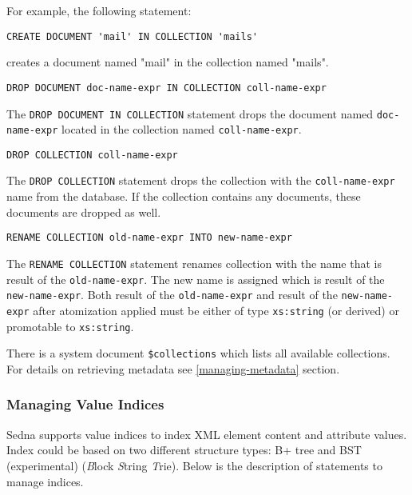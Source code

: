\documentclass[a4paper,12pt]{article}
\begin{document}
For example, the following statement:
\begin{verbatim}
CREATE DOCUMENT 'mail' IN COLLECTION 'mails'
\end{verbatim}
creates a document named "mail" in the collection named "mails".

\begin{verbatim}
DROP DOCUMENT doc-name-expr IN COLLECTION coll-name-expr
\end{verbatim}

The \verb!DROP DOCUMENT IN COLLECTION! statement drops the document named
\verb!doc-name-expr! located in the collection named \verb!coll-name-expr!.

\begin{verbatim}
DROP COLLECTION coll-name-expr
\end{verbatim}

The \verb!DROP COLLECTION! statement drops the collection with the
\verb!coll-name-expr! name from the database. If the collection contains any
documents, these documents are dropped as well.

\begin{verbatim}
RENAME COLLECTION old-name-expr INTO new-name-expr
\end{verbatim}

The \verb!RENAME COLLECTION! statement renames collection with the name that is
result of the \verb!old-name-expr!. The new name is assigned which is result of
the \verb!new-name-expr!. Both result of the \verb!old-name-expr! and result of
the \verb!new-name-expr! after atomization applied must be either of type
\verb!xs:string! (or derived) or promotable to \verb!xs:string!.

There is a system document \verb!$collections! which lists all available
collections. For details on retrieving metadata see \ref{managing-metadata}
section.


\subsubsection{Managing Value Indices}
\label{sec:managing-value-indices}

Sedna supports value indices to index XML element content and attribute values.
Index could be based on two different structure types: B+ tree and BST
(experimental) (\emph{B}lock \emph{S}tring \emph{T}rie). Below is the
description of statements to manage indices.
\end{document}
